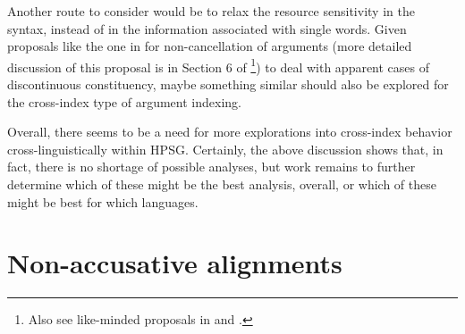 \documentclass[output=paper
                ,modfonts
                ,nonflat
	        ,collection
	        ,collectionchapter
	        ,collectiontoclongg
 	        ,biblatex
                ,babelshorthands
                ,newtxmath
                ,draftmode
                ,colorlinks, citecolor=brown
]{./langsci/langscibook}
\begin{document}
{Another route to consider would be to relax the resource sensitivity in the syntax, instead of in the information associated with single words. Given proposals like the one in \citet{Bender2008a} for non-cancellation of arguments (more detailed discussion of this proposal is in Section 6 of \footnote{Also see like-minded proposals in \citet{Meurers99b} and \citet{Mueller2008a}.}) to deal with apparent cases of discontinuous constituency, maybe something similar should also be explored for the cross-index type of argument indexing. 

Overall, there seems to be a need for more explorations into cross-index behavior cross-linguistically within HPSG. Certainly, the above discussion shows that, in fact, there is no shortage of possible analyses, but work remains to further determine which of these might be the best analysis, overall, or which of these might be best for which languages.

\section{Non-accusative alignments}

}
\end{document}

